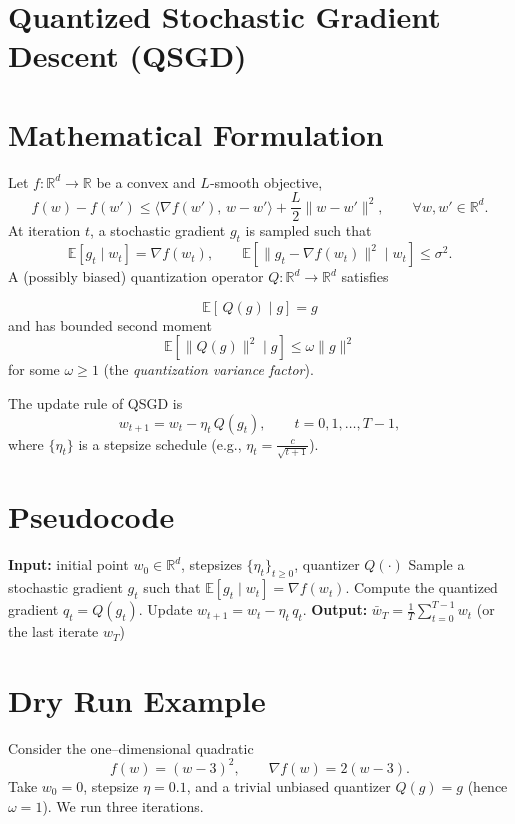 \documentclass[11pt]{article}
\newcommand{\E}{\mathbb{E}}
\newcommand{\R}{\mathbb{R}}
\begin{document}
\section*{Quantized Stochastic Gradient Descent (QSGD)}

\section*{Mathematical Formulation}
Let $f:\R^{d}\rightarrow\R$ be a convex and $L$‑smooth objective,
\[
f(w)-f(w')\le \langle \nabla f(w'),\, w-w'\rangle+\frac{L}{2}\|w-w'\|^{2},
\qquad\forall w,w'\in\R^{d}.
\]
At iteration $t$, a stochastic gradient $g_{t}$ is sampled such that
\[
\E[g_{t}\mid w_{t}]=\nabla f(w_{t}),\qquad
\E[\|g_{t}-\nabla f(w_{t})\|^{2}\mid w_{t}]\le\sigma^{2}.
\]
A (possibly biased) quantization operator $Q:\R^{d}\rightarrow\R^{d}$ satisfies

\[
\boxed{\E[\,Q(g)\mid g]=g}\tag{1}
\]
and has bounded second moment
\[
\boxed{\E[\|Q(g)\|^{2}\mid g]\le \omega\|g\|^{2}}\tag{2}
\]
for some $\omega\ge 1$ (the \emph{quantization variance factor}).

The update rule of QSGD is
\[
w_{t+1}=w_{t}-\eta_{t}\,Q(g_{t}),\qquad t=0,1,\dots,T-1,
\]
where $\{\eta_{t}\}$ is a stepsize schedule (e.g., $\eta_{t}=\frac{c}{\sqrt{t+1}}$).

\section*{Pseudocode}
\begin{algorithm}[H]
\caption{Quantized Stochastic Gradient Descent}
\begin{algorithmic}[1]
\State \textbf{Input:} initial point $w_{0}\in\R^{d}$, stepsizes $\{\eta_{t}\}_{t\ge0}$, quantizer $Q(\cdot)$
    \State Sample a stochastic gradient $g_{t}$ such that $\E[g_{t}\mid w_{t}]=\nabla f(w_{t})$.
    \State Compute the quantized gradient $q_{t}=Q(g_{t})$.
    \State Update $w_{t+1}=w_{t}-\eta_{t}\,q_{t}$.
\EndFor
\State \textbf{Output:} $ \bar w_{T}= \frac{1}{T}\sum_{t=0}^{T-1} w_{t}$ (or the last iterate $w_{T}$)
\end{algorithmic}
\end{algorithm}

\section*{Dry Run Example}
Consider the one–dimensional quadratic
\[
f(w)=(w-3)^{2},\qquad \nabla f(w)=2(w-3).
\]
Take $w_{0}=0$, stepsize $\eta=0.1$, and a trivial unbiased quantizer $Q(g)=g$ (hence $\omega=1$).  
We run three iterations.
\end{document}

